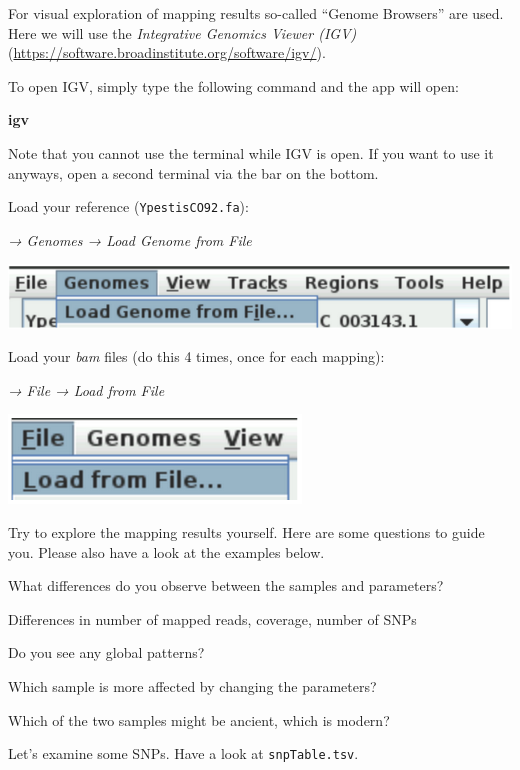 \documentclass[
  letterpaper,
]{book}
\newenvironment{Shaded}{}{}
\newcommand{\ExtensionTok}[1]{\textcolor[rgb]{0.84,0.23,0.29}{\textbf{#1}}}
\begin{document}
For visual exploration of mapping results so-called ``Genome Browsers''
are used. Here we will use the \emph{Integrative Genomics Viewer (IGV)}
(\url{https://software.broadinstitute.org/software/igv/}).

To open IGV, simply type the following command and the app will open:

\begin{Shaded}
\begin{Highlighting}[]
\ExtensionTok{igv}
\end{Highlighting}
\end{Shaded}

Note that you cannot use the terminal while IGV is open. If you want to
use it anyways, open a second terminal via the bar on the bottom.

Load your reference (\texttt{YpestisCO92.fa}):

\emph{→ Genomes → Load Genome from File}

\includegraphics{assets/images/chapters/genome-mapping/IGV_load_genome.png}

Load your \emph{bam} files (do this 4 times, once for each mapping):

\emph{→ File → Load from File}

\includegraphics{assets/images/chapters/genome-mapping/IGV_load_bam.png}

Try to explore the mapping results yourself. Here are some questions to
guide you. Please also have a look at the examples below.

What differences do you observe between the samples and parameters?

Differences in number of mapped reads, coverage, number of SNPs

Do you see any global patterns?

Which sample is more affected by changing the parameters?

Which of the two samples might be ancient, which is modern?

Let's examine some SNPs. Have a look at \texttt{snpTable.tsv}.
\end{document}
